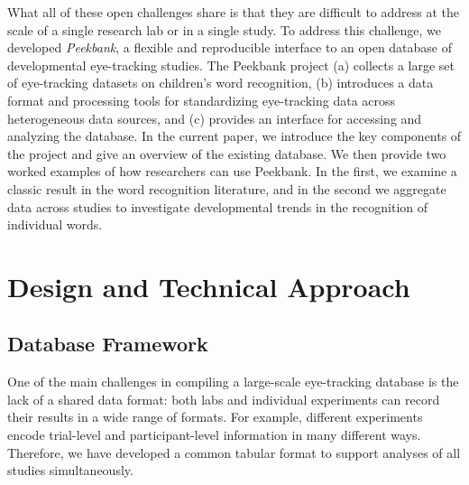 \documentclass[
  english,
  man,floatsintext]{apa6}
\begin{document}
What all of these open challenges share is that they are difficult to address at the scale of a single research lab or in a single study.
To address this challenge, we developed \emph{Peekbank}, a flexible and reproducible interface to an open database of developmental eye-tracking studies.
The Peekbank project (a) collects a large set of eye-tracking datasets on children's word recognition, (b) introduces a data format and processing tools for standardizing eye-tracking data across heterogeneous data sources, and (c) provides an interface for accessing and analyzing the database.
In the current paper, we introduce the key components of the project and give an overview of the existing database.
We then provide two worked examples of how researchers can use Peekbank. In the first, we examine a classic result in the word recognition literature, and in the second we aggregate data across studies to investigate developmental trends in the recognition of individual words.

\hypertarget{design-and-technical-approach}{%
\section{Design and Technical Approach}\label{design-and-technical-approach}}

\hypertarget{database-framework}{%
\subsection{Database Framework}\label{database-framework}}

One of the main challenges in compiling a large-scale eye-tracking database is the lack of a shared data format: both labs and individual experiments can record their results in a wide range of formats.
For example, different experiments encode trial-level and participant-level information in many different ways.
Therefore, we have developed a common tabular format to support analyses of all studies simultaneously.
\end{document}

